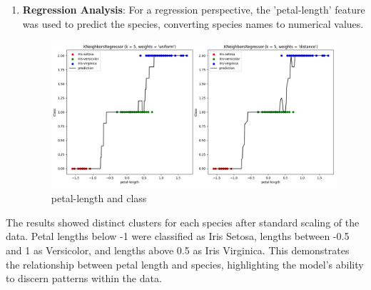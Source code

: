 \documentclass[a4paper]{article}
\begin{document}
\begin{enumerate}
\item \textbf{Regression Analysis}: For a regression perspective, the 'petal-length' feature was used to predict the species, converting species names to numerical values.
	\begin{figure}[h]
		\centering
		\includegraphics[width=1\textwidth]{picture/KNN_Regression_petal}
		\caption{petal-length and class}
		\label{fig:example}
	\end{figure}
\end{enumerate}
 The results showed distinct clusters for each species after standard scaling of the data. Petal lengths below -1 were classified as Iris Setosa, lengths between -0.5 and 1 as Versicolor, and lengths above 0.5 as Iris Virginica. This demonstrates the relationship between petal length and species, highlighting the model's ability to discern patterns within the data.
\end{document}
